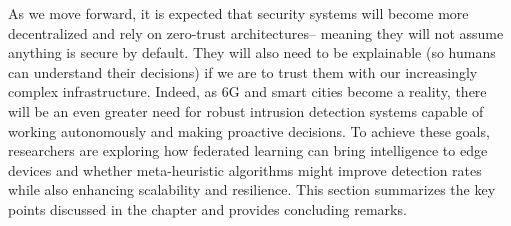 \documentclass[12pt]{article}
\begin{document}
As we move forward, it is expected that security systems will become more decentralized and rely on zero-trust architectures– meaning they will not assume anything is secure by default. They will also need to be explainable (so humans can understand their decisions) if we are to trust them with our increasingly complex infrastructure. Indeed, as 6G and smart cities become a reality, there will be an even greater need for robust intrusion detection systems capable of working autonomously and making proactive decisions. To achieve these goals, researchers are exploring how federated learning can bring intelligence to edge devices and whether meta-heuristic algorithms might improve detection rates while also enhancing scalability and resilience.
	This section summarizes the key points discussed in the chapter and provides concluding remarks.
	

	
	
	
\end{document}
